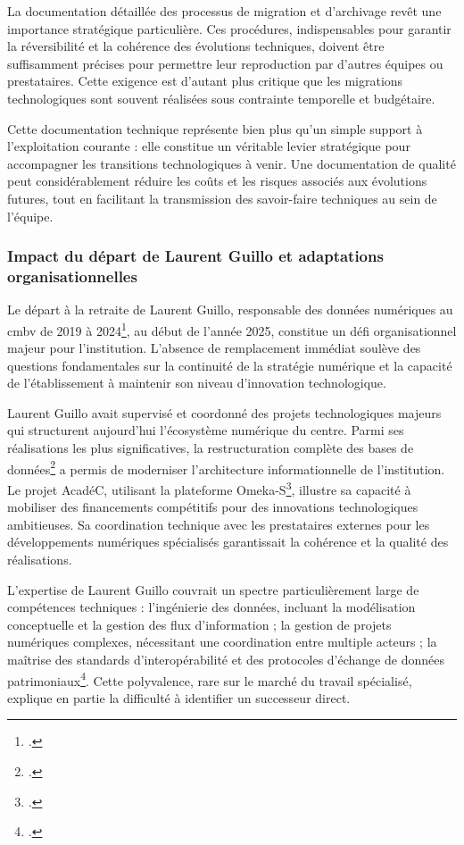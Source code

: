 La documentation détaillée des processus de migration et d'archivage revêt une importance stratégique particulière. Ces procédures, indispensables pour garantir la réversibilité et la cohérence des évolutions techniques, doivent être suffisamment précises pour permettre leur reproduction par d'autres équipes ou prestataires. Cette exigence est d'autant plus critique que les migrations technologiques sont souvent réalisées sous contrainte temporelle et budgétaire.

Cette documentation technique représente bien plus qu'un simple support à l'exploitation courante : elle constitue un véritable levier stratégique pour accompagner les transitions technologiques à venir. Une documentation de qualité peut considérablement réduire les coûts et les risques associés aux évolutions futures, tout en facilitant la transmission des savoir-faire techniques au sein de l'équipe.

\subsubsection{Impact du départ de Laurent Guillo et adaptations organisationnelles}

Le départ à la retraite de Laurent Guillo, responsable des données numériques au \gls{cmbv} de 2019 à 2024\footcite{GuilloLaurentCESR}, au début de l'année 2025, constitue un défi organisationnel majeur pour l'institution. L'absence de remplacement immédiat soulève des questions fondamentales sur la continuité de la stratégie numérique et la capacité de l'établissement à maintenir son niveau d'innovation technologique.

Laurent Guillo avait supervisé et coordonné des projets technologiques majeurs qui structurent aujourd'hui l'écosystème numérique du centre. Parmi ses réalisations les plus significatives, la restructuration complète des bases de données\footcite{RestructurationBasesDonnees} a permis de moderniser l'architecture informationnelle de l'institution. Le projet  AcadéC, utilisant la plateforme Omeka-S\footcite{BasesDonneesAcadeC}, illustre sa capacité à mobiliser des financements compétitifs pour des innovations technologiques ambitieuses. Sa coordination technique avec les prestataires externes pour les développements numériques spécialisés garantissait la cohérence et la qualité des réalisations.

L'expertise de Laurent Guillo couvrait un spectre particulièrement large de compétences techniques : l'ingénierie des données, incluant la modélisation conceptuelle et la gestion des flux d'information ; la gestion de projets numériques complexes, nécessitant une coordination entre multiple acteurs ; la maîtrise des standards d'interopérabilité et des protocoles d'échange de données patrimoniaux\footcite{GuilloLaurentCESR}. Cette polyvalence, rare sur le marché du travail spécialisé, explique en partie la difficulté à identifier un successeur direct.

